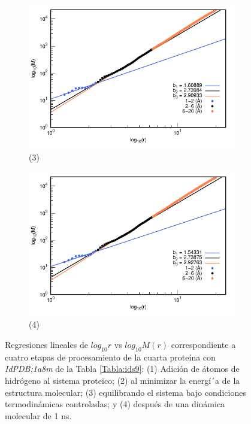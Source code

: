 \begin{figure}[H]
	\vspace{0cm} %
	
	\hspace{-0.3cm} 
	\begin{subfigure}{0.49\textwidth}
		\centering
		\includegraphics[width=\linewidth,page=1]{graphs/PDBs/1a8m/1a8mEq.pdf}
		\caption{(3)}
	\end{subfigure}
	\hspace{0.2cm}
	\begin{subfigure}{0.49\textwidth} %
		\centering
		\includegraphics[width=\linewidth,page=1]{graphs/PDBs/1a8m/1a8m1ns.pdf}
		\caption{(4)}
	\end{subfigure}
	\caption{Regresiones lineales de $log_{10}r$ vs $log_{10}M(r)$ correspondiente a cuatro etapas de procesamiento de la cuarta prote\'{i}na con \textit{IdPDB:1a8m} de la Tabla \ref{Tabla:ids9}: (1) Adici\'{o}n de \'{a}tomos de hidr\'{o}geno al sistema proteico; (2) al minimizar la energ\'{i´}a de la estructura molecular; (3) equilibrando el sistema bajo condiciones termodin\'{a}micas controladas; y (4) despu\'{e}s de una din\'{a}mica molecular de 1 ns.}
	\label{fig:1a8m}
\end{figure}


